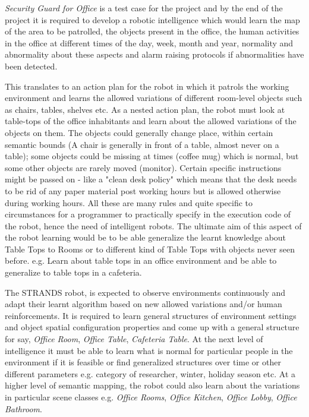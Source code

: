 \documentclass[letterpaper]{article}
\begin{document}
\textit{Security Guard for Office} is a test case for the project and by the end of the project it is required to develop a robotic intelligence which would learn the map of the area to be patrolled, the objects present in the office, the human activities in the office at different times of the day, week, month and year, normality and abnormality about these aspects and alarm raising protocols if abnormalities have been detected. 

This translates to an action plan for the robot in which it patrols the working environment and learns the allowed variations of different room-level objects such as chairs, tables, shelves etc. As a nested action plan, the robot must look at table-tops of the office inhabitants and learn about the allowed variations of the objects on them. The objects could generally change place, within certain semantic bounds (A chair is generally in front of a table, almost never on a table); some objects could be missing at times (coffee mug) which is normal, but some other objects are rarely moved (monitor). Certain specific instructions might be passed on - like a "clean desk policy" which means that the desk needs to be rid of any paper material post working hours but is allowed otherwise during working hours. All these are many rules and quite specific to circumstances for a programmer to practically specify in the execution code of the robot, hence the need of intelligent robots. The ultimate aim of this aspect of the robot learning would be to be able generalize the learnt knowledge about Table Tops to Rooms or to different kind of Table Tops with objects never seen before. e.g. Learn about table tops in an office environment and be able to generalize to table tops in a cafeteria.

The STRANDS robot, is expected to observe environments continuously and adapt their learnt algorithm based on new allowed variations and/or human reinforcements. It is required to learn general structures of environment settings and object spatial configuration properties and come up with a general structure for say, \textit{Office Room}, \textit{Office Table}, \textit{Cafeteria Table}. At the next level of intelligence it must be able to learn what is normal for particular people in the environment if it is feasible or find generalized structures over time or other different parameters e.g. category of researcher, winter, holiday season etc. At a higher level of semantic mapping, the robot could also learn about the variations in particular scene classes e.g. \textit{Office Rooms}, \textit{Office Kitchen}, \textit{Office Lobby}, \textit{Office Bathroom}.
\end{document}
